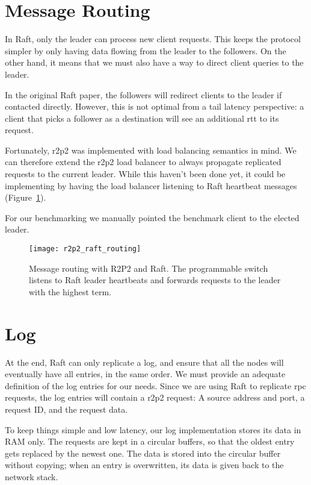 \section{Message Routing}
\label{sec:message_routing}

In Raft, only the leader can process new client requests.
This keeps the protocol simpler by only having data flowing from the leader to the followers.
On the other hand, it means that we must also have a way to direct client queries to the leader.

In the original Raft paper\cite{raft}, the followers will redirect clients to the leader if contacted directly.
However, this is not optimal from a tail latency perspective: a client that picks a follower as a destination will see an additional \gls{rtt} to its request.

Fortunately, \gls{r2p2} was implemented with load balancing semantics in mind.
We can therefore extend the \gls{r2p2} load balancer to always propagate replicated requests to the current leader.
While this haven't been done yet, it could be implementing by having the load balancer listening to Raft heartbeat messages (Figure~\ref{fig:r2p2_raft_routing}).

For our benchmarking we manually pointed the benchmark client to the elected leader.

\begin{figure}
    \centering
    \texttt{[image: r2p2\_raft\_routing]}
    \caption{Message routing with R2P2 and Raft.
        The programmable switch listens to Raft leader heartbeats and forwards requests to the leader with the highest term.
    \label{fig:r2p2_raft_routing}
    }
\end{figure}

\section{Log}

At the end, Raft can only replicate a log, and ensure that all the nodes will eventually have all entries, in the same order.
We must provide an adequate definition of the log entries for our needs.
Since we are using Raft to replicate \gls{rpc} requests, the log entries will contain a \gls{r2p2} request: A source address and port, a request ID, and the request data.

To keep things simple and low latency, our log implementation stores its data in RAM only.
The requests are kept in a circular buffers, so that the oldest entry gets replaced by the newest one.
The data is stored into the circular buffer without copying; when an entry is overwritten, its data is given back to the network stack.


